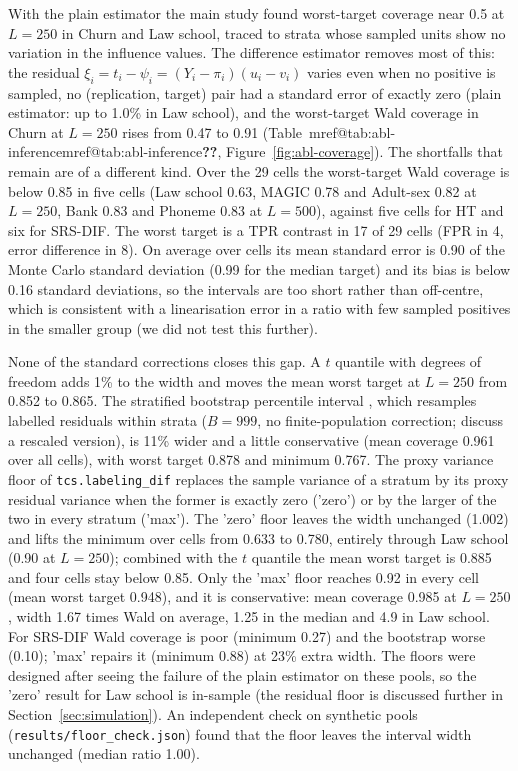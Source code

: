 \documentclass[pdflatex,sn-mathphys-num,iicol]{sn-jnl}
\makeatletter
\theoremstyle{thmstyleone}
\theoremstyle{thmstyletwo}
\theoremstyle{thmstylethree}
\newcommand{\Mref}[1]{\ifcsname mref@#1\endcsname\csname mref@#1\endcsname\else\textbf{??}\fi}
\makeatother
\begin{document}
With the plain estimator the main study found worst-target coverage near 0.5 at $L=250$ in Churn and Law school, traced to strata whose sampled units show no variation in the influence values. The difference estimator removes most of this: the residual $\xi_i=t_i-\psi_i=(Y_i-\pi_i)(u_i-v_i)$ varies even when no positive is sampled, no (replication, target) pair had a standard error of exactly zero (plain estimator: up to 1.0\% in Law school), and the worst-target Wald coverage in Churn at $L=250$ rises from 0.47 to 0.91 (Table~\Mref{tab:abl-inference}, Figure~\ref{fig:abl-coverage}). The shortfalls that remain are of a different kind. Over the 29 cells the worst-target Wald coverage is below 0.85 in five cells (Law school 0.63, MAGIC 0.78 and Adult-sex 0.82 at $L=250$, Bank 0.83 and Phoneme 0.83 at $L=500$), against five cells for HT and six for SRS-DIF. The worst target is a TPR contrast in 17 of 29 cells (FPR in 4, error difference in 8). On average over cells its mean standard error is 0.90 of the Monte Carlo standard deviation (0.99 for the median target) and its bias is below 0.16 standard deviations, so the intervals are too short rather than off-centre, which is consistent with a linearisation error in a ratio with few sampled positives in the smaller group (we did not test this further).

None of the standard corrections closes this gap. A $t$ quantile with \citet{satterthwaite1946} degrees of freedom adds 1\% to the width and moves the mean worst target at $L=250$ from 0.852 to 0.865. The stratified bootstrap percentile interval \citep{efron1979}, which resamples labelled residuals within strata ($B=999$, no finite-population correction; \citealt{raowu1988} discuss a rescaled version), is 11\% wider and a little conservative (mean coverage 0.961 over all cells), with worst target 0.878 and minimum 0.767. The proxy variance floor of \texttt{tcs.labeling\_dif} replaces the sample variance of a stratum by its proxy residual variance when the former is exactly zero ('zero') or by the larger of the two in every stratum ('max'). The 'zero' floor leaves the width unchanged (1.002) and lifts the minimum over cells from 0.633 to 0.780, entirely through Law school (0.90 at $L=250$); combined with the $t$ quantile the mean worst target is 0.885 and four cells stay below 0.85. Only the 'max' floor reaches 0.92 in every cell (mean worst target 0.948), and it is conservative: mean coverage 0.985 at $L=250$, width 1.67 times Wald on average, 1.25 in the median and 4.9 in Law school. For SRS-DIF Wald coverage is poor (minimum 0.27) and the bootstrap worse (0.10); 'max' repairs it (minimum 0.88) at 23\% extra width. The floors were designed after seeing the failure of the plain estimator on these pools, so the 'zero' result for Law school is in-sample (the residual floor is discussed further in Section~\ref{sec:simulation}). An independent check on synthetic pools (\texttt{results/floor\_check.json}) found that the floor leaves the interval width unchanged (median ratio 1.00).
\end{document}
